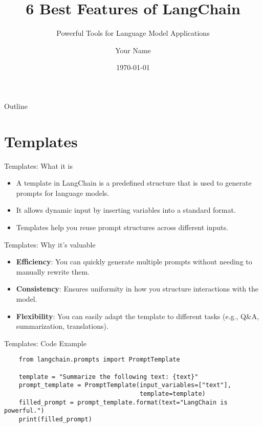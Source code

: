 \documentclass{beamer}
\title{6 Best Features of LangChain}
\subtitle{Powerful Tools for Language Model Applications}
\author{Your Name}
\institute{Your Institution}
\date{\today}
\begin{document}
\begin{frame}
    \titlepage
\end{frame}

\begin{frame}{Outline}
    \tableofcontents
\end{frame}

\section{Templates}

\begin{frame}{Templates: What it is}
    \begin{itemize}
        \item A template in LangChain is a predefined structure that is used to generate prompts for language models.
        \item It allows dynamic input by inserting variables into a standard format.
        \item Templates help you reuse prompt structures across different inputs.
    \end{itemize}
\end{frame}

\begin{frame}{Templates: Why it's valuable}
    \begin{itemize}
        \item \textbf{Efficiency}: You can quickly generate multiple prompts without needing to manually rewrite them.
        \item \textbf{Consistency}: Ensures uniformity in how you structure interactions with the model.
        \item \textbf{Flexibility}: You can easily adapt the template to different tasks (e.g., Q&A, summarization, translations).
    \end{itemize}
\end{frame}

\begin{frame}[fragile]{Templates: Code Example}
    \begin{verbatim}
    from langchain.prompts import PromptTemplate

    template = "Summarize the following text: {text}"
    prompt_template = PromptTemplate(input_variables=["text"],
                                     template=template)
    filled_prompt = prompt_template.format(text="LangChain is powerful.")
    print(filled_prompt)
    \end{verbatim}
\end{frame}
\end{document}
